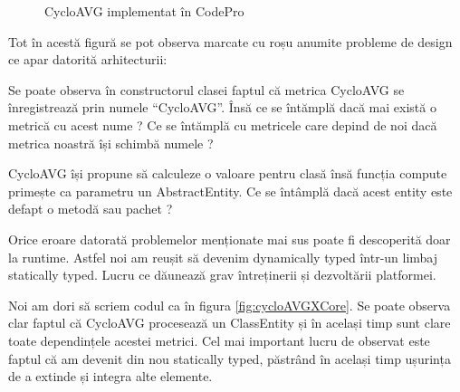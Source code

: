 \begin{figure}
\caption{CycloAVG implementat în CodePro}
\label{fig:cycloAVG}
\end{figure}

Tot în acestă
figură se pot observa marcate cu roșu anumite probleme de design ce apar
datorită arhitecturii:
	\begin{description}[labelindent=2cm]
		\item[constante \enquote{magice}] {Se poate observa în constructorul clasei
		faptul că metrica CycloAVG se înregistrează prin numele \enquote{CycloAVG}. Însă ce se
întămplă dacă mai există o metrică cu acest nume ? Ce se întămplă cu metricele care
depind de noi dacă metrica noastră își schimbă numele ?}
		\item[generalizare] {CycloAVG își propune să calculeze o valoare pentru clasă
însă funcția compute primește ca parametru un AbstractEntity. Ce se întâmplă
dacă acest entity este defapt o metodă sau pachet ?}
	\end{description}
	Orice eroare datorată problemelor menționate mai sus poate fi descoperită doar
la runtime. Astfel noi am reușit să devenim dynamically typed într-un limbaj
statically typed. Lucru ce dăunează grav întreținerii și dezvoltării platformei.
	

	Noi am dori să scriem codul ca în figura \ref{fig:cycloAVGXCore}. Se poate
observa clar faptul că CycloAVG procesează un ClassEntity și în același timp sunt clare 
toate dependințele acestei metrici. Cel mai important lucru de observat este
faptul că am devenit din nou statically typed, păstrând în același timp ușurința
de a extinde și integra alte elemente.

